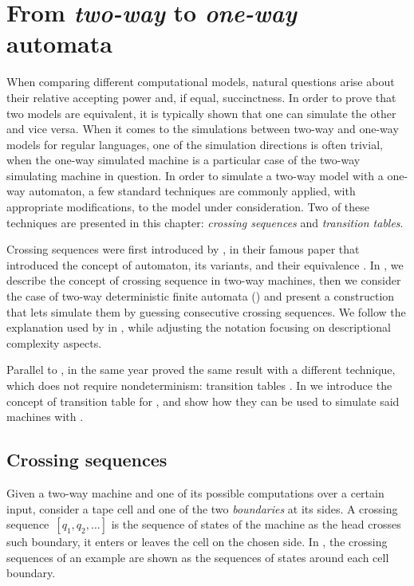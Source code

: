 \chapter{From \emph{two-way} to \emph{one-way} automata}\label{ch:techniques}
When comparing different computational models, natural questions arise about their relative accepting power and, if equal, succinctness.
In order to prove that two models are equivalent, it is typically shown that one can simulate the other and vice versa.
When it comes to the simulations between two-way and one-way models for regular languages, one of the simulation directions is often trivial, when the one-way simulated machine is a particular case of the two-way simulating machine in question.
In order to simulate a two-way model with a one-way automaton, a few standard techniques are commonly applied, with appropriate modifications, to the model under consideration.
Two of these techniques are presented in this chapter: \emph{crossing sequences} and \emph{transition tables}.

Crossing sequences were first introduced by \citeauthor{RabSco59}, in their famous \citeyear{RabSco59} paper that introduced the concept of automaton, its variants, and their equivalence \cite{RabSco59}.
In , we describe the concept of crossing sequence in two-way machines, then we consider the case of two-way deterministic finite automata (\TDFAs) and present a construction that lets \ONFAs simulate them by guessing consecutive crossing sequences.
We follow the explanation used by \citeauthor{HopUll79} in \cite{HopUll79}, while adjusting the notation focusing on descriptional complexity aspects.

Parallel to \citeauthor{RabSco59}, in the same year \citeauthor{She59} proved the same result with a different technique, which does not require nondeterminism: transition tables \cite{She59}.
In  we introduce the concept of transition table for \TDFAs, and show how they can be used to simulate said machines with \ODFAs.


\section{Crossing sequences}\label{sec:crossseq2DFA}
Given a two-way machine and one of its possible computations over a certain input, consider a tape cell and one of the two \emph{boundaries} at its sides.
A crossing sequence~$[q_1,q_2,\dots]$ is the sequence of states of the machine as the head crosses such boundary, \ie it enters or leaves the cell on the chosen side.
In , the crossing sequences of an example \TDFA are shown as the sequences of states around each cell boundary.


